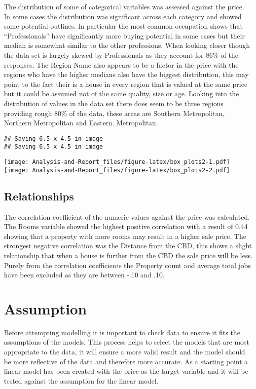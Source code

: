 \documentclass[
]{article}
\begin{document}
The distribution of some of categorical variables was assessed against
the price. In some cases the distribution was significant across each
category and showed some potential outlines. In particular the most
common occupation shows that ``Professionals'' have significantly more
buying potential in some cases but their median is somewhat similar to
the other professions. When looking closer though the data set is
largely skewed by Professionals as they account for 86\% of the
responses. The Region Name also appears to be a factor in the price with
the regions who have the higher medians also have the biggest
distribution, this may point to the fact their is a house in every
region that is valued at the same price but it could be assumed not of
the same quality, size or age. Looking into the distribution of values
in the data set there does seem to be three regions providing rough 80\%
of the data, these areas are Southern Metropolitan, Northern
Metropolitan and Eastern. Metropolitan.

\begin{verbatim}
## Saving 6.5 x 4.5 in image
## Saving 6.5 x 4.5 in image
\end{verbatim}

\texttt{[image: Analysis-and-Report\_files/figure-latex/box\_plots2-1.pdf]}
\texttt{[image: Analysis-and-Report\_files/figure-latex/box\_plots2-2.pdf]}

\hypertarget{relationships}{%
\subsection{Relationships}\label{relationships}}

The correlation coefficient of the numeric values against the price was
calculated. The Rooms variable showed the highest positive correlation
with a result of 0.44 showing that a property with more rooms may result
in a higher sale price. The strongest negative correlation was the
Distance from the CBD, this shows a slight relationship that when a
house is further from the CBD the sale price will be less. Purely from
the correlation coefficients the Property count and average total jobs
have been excluded as they are between -.10 and .10.

\hypertarget{assumption}{%
\section{Assumption}\label{assumption}}

Before attempting modelling it is important to check data to ensure it
fits the assumptions of the models. This process helps to select the
models that are most appropriate to the data, it will ensure a more
valid result and the model should be more reflective of the data and
therefore more accurate. As a starting point a linear model has been
created with the price as the target variable and it will be tested
against the assumption for the linear model.
\end{document}
